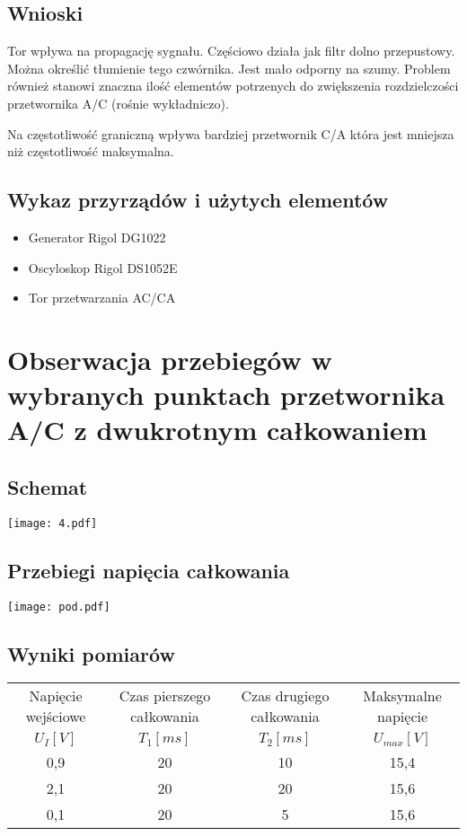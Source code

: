 \documentclass[11pt]{article}
\begin{document}
\subsection{Wnioski}

Tor wpływa na propagację sygnału. Częściowo działa jak filtr dolno przepustowy. Można określić tłumienie tego czwórnika. Jest mało odporny na szumy. Problem również stanowi znaczna ilość elementów potrzenych do zwiększenia rozdzielczości przetwornika A/C (rośnie wykładniczo). 

Na częstotliwość graniczną wpływa bardziej przetwornik C/A która jest mniejsza niż częstotliwość maksymalna.

\subsection{Wykaz przyrządów i użytych elementów}
\begin{itemize}
\item{Generator Rigol DG1022}
\item{Oscyloskop Rigol DS1052E}
\item{Tor przetwarzania AC/CA}
\end{itemize} 

\newpage
\section{Obserwacja przebiegów w wybranych punktach przetwornika A/C z dwukrotnym całkowaniem}

\subsection{Schemat}

\begin{center}
\texttt{[image: 4.pdf]}
\end{center}

\subsection{Przebiegi napięcia całkowania}

\begin{center}
\texttt{[image: pod.pdf]}
\end{center}

\subsection{Wyniki pomiarów}
\begin{tabular}{|c|c|c|c|}
\hline
Napięcie wejściowe & Czas pierszego całkowania & Czas drugiego całkowania& Maksymalne napięcie \\
$U_{I}[V]$ & $T_1[ms]$ & $T_2[ms]$ & $U_{max}[V]$ \\
\hline
0,9 & 20 & 10 & 15,4 \\
\hline
2,1 & 20 & 20 & 15,6 \\
\hline
0,1 & 20 & 5 & 15,6 \\
\hline
\end{tabular}
\end{document}
